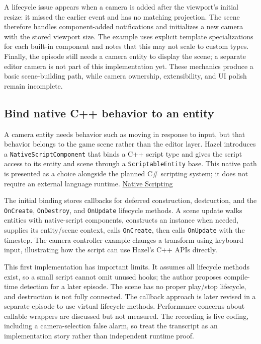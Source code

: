 A lifecycle issue appears when a camera is added after the viewport's initial resize: it missed the earlier event and has no matching projection. The scene therefore handles component-added notifications and initializes a new camera with the stored viewport size. The example uses explicit template specializations for each built-in component and notes that this may not scale to custom types. Finally, the episode still needs a camera entity to display the scene; a separate editor camera is not part of this implementation yet. These mechanics produce a basic scene-building path, while camera ownership, extensibility, and UI polish remain incomplete.

\subsection{Bind native C++ behavior to an entity}\label{06-engine-ii-ch031-bind-native-c-behavior-to-an-entity}

A camera entity needs behavior such as moving in response to input, but that behavior belongs to the game scene rather than the editor layer. Hazel introduces a \texttt{NativeScriptComponent} that binds a C++ script type and gives the script access to its entity and scene through a \texttt{ScriptableEntity} base. This native path is presented as a choice alongside the planned C\# scripting system; it does not require an external language runtime. \href{https://www.youtube.com/watch?v=iIUhg88MK5M}{Native Scripting}

The initial binding stores callbacks for deferred construction, destruction, and the \texttt{OnCreate}, \texttt{OnDestroy}, and \texttt{OnUpdate} lifecycle methods. A scene update walks entities with native-script components, constructs an instance when needed, supplies its entity/scene context, calls \texttt{OnCreate}, then calls \texttt{OnUpdate} with the timestep. The camera-controller example changes a transform using keyboard input, illustrating how the script can use Hazel's C++ APIs directly.

This first implementation has important limits. It assumes all lifecycle methods exist, so a small script cannot omit unused hooks; the author proposes compile-time detection for a later episode. The scene has no proper play/stop lifecycle, and destruction is not fully connected. The callback approach is later revised in a separate episode to use virtual lifecycle methods. Performance concerns about callable wrappers are discussed but not measured. The recording is live coding, including a camera-selection false alarm, so treat the transcript as an implementation story rather than independent runtime proof.

